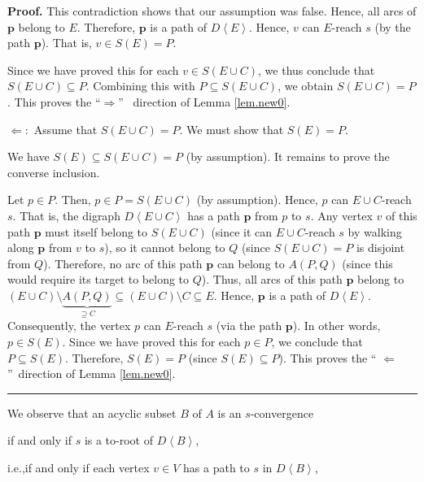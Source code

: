\documentclass[numbers=enddot,12pt,final,onecolumn,notitlepage]{scrartcl}%
\theoremstyle{definition}
\newenvironment{proof}[1][Proof]{\noindent\textbf{#1.} }{\ \rule{0.5em}{0.5em}}
\theoremstyle{plainsl}
\begin{document}
\begin{proof}
This contradiction shows that our assumption was false. Hence, all arcs of
$\mathbf{p}$ belong to $E$. Therefore, $\mathbf{p}$ is a path of
$D\left\langle E\right\rangle $. Hence, $v$ can $E$-reach $s$ (by the path
$\mathbf{p}$). That is, $v\in S\left(  E\right)  =P$.

Since we have proved this for each $v\in S\left(  E\cup C\right)  $, we thus
conclude that $S\left(  E\cup C\right)  \subseteq P$. Combining this with
$P\subseteq S\left(  E\cup C\right)  $, we obtain $S\left(  E\cup C\right)
=P$. This proves the \textquotedblleft$\Longrightarrow$\textquotedblright%
\ direction of Lemma \ref{lem.new0}. \medskip

$\Longleftarrow:$ Assume that $S\left(  E\cup C\right)  =P$. We must show that
$S\left(  E\right)  =P$.

We have $S\left(  E\right)  \subseteq S\left(  E\cup C\right)  =P$ (by
assumption). It remains to prove the converse inclusion.

Let $p\in P$. Then, $p\in P=S\left(  E\cup C\right)  $ (by assumption). Hence,
$p$ can $E\cup C$-reach $s$. That is, the digraph $D\left\langle E\cup
C\right\rangle $ has a path $\mathbf{p}$ from $p$ to $s$. Any vertex $v$ of
this path $\mathbf{p}$ must itself belong to $S\left(  E\cup C\right)  $
(since it can $E\cup C$-reach $s$ by walking along $\mathbf{p}$ from $v$ to
$s$), so it cannot belong to $Q$ (since $S\left(  E\cup C\right)  =P$ is
disjoint from $Q$). Therefore, no arc of this path $\mathbf{p}$ can belong to
$A\left(  P,Q\right)  $ (since this would require its target to belong to
$Q$). Thus, all arcs of this path $\mathbf{p}$ belong to $\left(  E\cup
C\right)  \setminus\underbrace{A\left(  P,Q\right)  }_{\supseteq C}%
\subseteq\left(  E\cup C\right)  \setminus C\subseteq E$. Hence, $\mathbf{p}$
is a path of $D\left\langle E\right\rangle $. Consequently, the vertex $p$ can
$E$-reach $s$ (via the path $\mathbf{p}$). In other words, $p\in S\left(
E\right)  $. Since we have proved this for each $p\in P$, we conclude that
$P\subseteq S\left(  E\right)  $. Therefore, $S\left(  E\right)  =P$ (since
$S\left(  E\right)  \subseteq P$). This proves the \textquotedblleft%
$\Longleftarrow$\textquotedblright\ direction of Lemma \ref{lem.new0}.
\end{proof}

We observe that an acyclic subset $B$ of $A$ is an $s$-convergence

\qquad\qquad if and only if $s$ is a to-root of $D\left\langle B\right\rangle
$,

\qquad i.e.,\quad if and only if each vertex $v\in V$ has a path to $s$ in
$D\left\langle B\right\rangle $,
\end{document}
